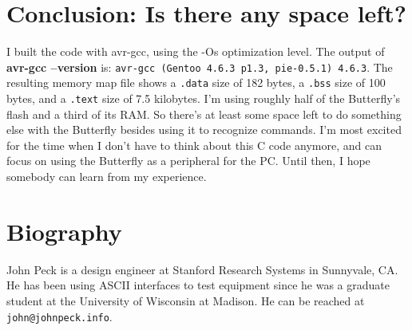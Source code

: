 \clearpage{}
\section{Conclusion: Is there any space left?}
I built the code with avr-gcc, using the -Os optimization level.  The output of \textbf{avr-gcc --version} is: \texttt{avr-gcc (Gentoo 4.6.3 p1.3, pie-0.5.1) 4.6.3}. The resulting memory map file shows a \texttt{.data} size of 182 bytes, a \texttt{.bss} size of 100 bytes, and a \texttt{.text} size of 7.5 kilobytes.  I'm using roughly half of the Butterfly's flash and a third of its RAM.  So there's at least some space left to do something else with the Butterfly besides using it to recognize commands.  I'm most excited for the time when I don't have to think about this C code anymore, and can focus on using the Butterfly as a peripheral for the PC.  Until then, I hope somebody can learn from my experience.

\section{Biography}
John Peck is a design engineer at Stanford Research Systems in Sunnyvale, CA.  He has been using ASCII interfaces to test equipment since he was a graduate student at the University of Wisconsin at Madison.  He can be reached at \texttt{john@johnpeck.info}.


\clearpage{}
\raggedright


